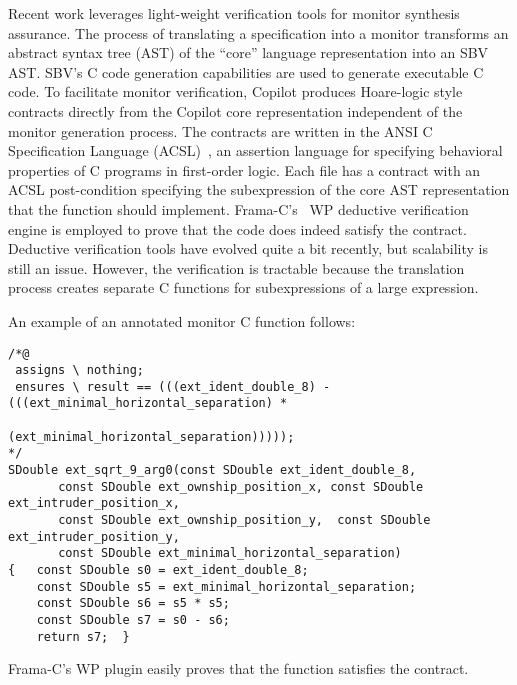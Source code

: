 Recent work  leverages light-weight verification tools for monitor
synthesis assurance.   The process of translating a specification into a monitor
transforms an abstract syntax tree (AST) of the ``core'' language representation into an SBV
AST.  SBV's C code generation capabilities are used to generate 
executable C code.  To facilitate monitor verification, Copilot 
produces Hoare-logic style contracts directly from the Copilot core
representation independent of the monitor generation process. The
contracts are written in the ANSI C Specification Language
(ACSL)~\cite{baudin09acsl}, an assertion language for specifying
behavioral properties of C programs in first-order logic.  Each file has a contract  with an ACSL 
post-condition  specifying the subexpression of the core
AST representation that the function should  implement. 
Frama-C's~\cite{framac} WP deductive verification engine is employed
to prove that the code does indeed satisfy the contract. Deductive
verification tools have evolved quite a bit recently, but scalability
is still an issue. However, the verification is tractable because the  translation process creates separate C
functions for subexpressions of a large expression. 


An example of an annotated monitor C function follows: 

\begin{Verbatim}[fontsize=\scriptsize]
/*@
 assigns \ nothing;
 ensures \ result == (((ext_ident_double_8) - (((ext_minimal_horizontal_separation) *
                                 (ext_minimal_horizontal_separation)))));
*/
SDouble ext_sqrt_9_arg0(const SDouble ext_ident_double_8,
       const SDouble ext_ownship_position_x, const SDouble ext_intruder_position_x,
       const SDouble ext_ownship_position_y,  const SDouble ext_intruder_position_y,
       const SDouble ext_minimal_horizontal_separation)
{   const SDouble s0 = ext_ident_double_8;
    const SDouble s5 = ext_minimal_horizontal_separation;
    const SDouble s6 = s5 * s5;
    const SDouble s7 = s0 - s6;
    return s7;  }
\end{Verbatim}

\noindent
Frama-C's WP plugin easily proves that the function satisfies the
contract. 

